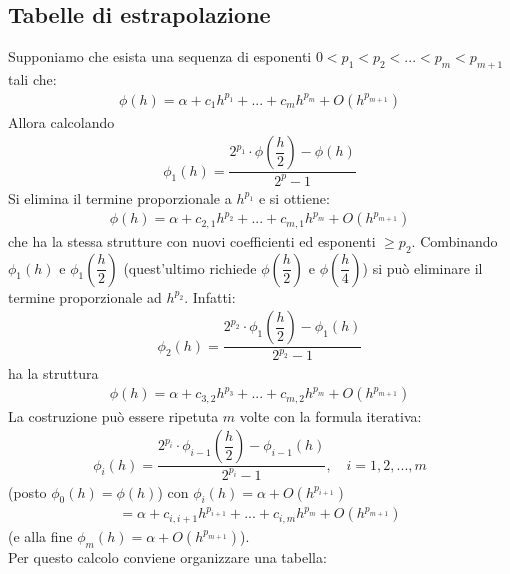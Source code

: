 \subsection{Tabelle di estrapolazione}
Supponiamo che esista una sequenza di esponenti $ 0<p_1<p_2<...<p_m<p_{m+1}$ tali che:
\[ \begin{split}
	\phi(h)=\alpha+c_1h^{p_1}+...+c_mh^{p_m}+O(h^{p_{m+1}})
\end{split} \]
Allora calcolando
\[ \begin{split}
	\phi_1(h)=\dfrac{2^{p_1}\cdot \phi\left( \dfrac{h}{2} \right)-\phi (h) }{2^p-1}
\end{split} \]
Si elimina il termine proporzionale a $h^{p_1}$ e si ottiene:
\[ \begin{split}
	\phi(h)=\alpha+c_{2,1}h^{p_2}+...+c_{m,1}h^{p_m}+O(h^{p_{m+1}})
\end{split} \]
che ha la stessa strutture con
nuovi coefficienti ed esponenti $\geq p_2$. Combinando $\phi_1(h)$ e $\phi_1 \left( \dfrac{h}{2} \right)$ (quest'ultimo richiede $\phi \left( \dfrac{h}{2} \right)$ e $\phi \left( \dfrac{h}{4} \right)$) si può eliminare il termine proporzionale ad $h^{p_2}$. Infatti:
\[ \begin{split}
	\phi_2(h)=\dfrac{2^{p_2}\cdot \phi_1\left( \dfrac{h}{2} \right) -\phi_1 (h)}{2^{p_2}-1}
\end{split} \]
ha la struttura
\[ \begin{split}
	\phi(h)=\alpha+c_{3,2}h^{p_3}+...+c_{m,2}h^{p_m}+O(h^{p_{m+1}})
\end{split} \]
La costruzione può essere ripetuta $m$ volte con la formula iterativa:
\[ \begin{split}
	\phi_i(h)=\dfrac{2^{p_i}\cdot \phi_{i-1} \left( \dfrac{h}{2} \right) -\phi_{i-1} (h)}{2^{p_i}-1}, \quad i=1,2,...,m
\end{split} \]
(posto $\phi_0(h)=\phi(h)$) con  $\phi_i(h)=\alpha + O(h^{p_{i+1}})$
\[ \begin{split}
	=\alpha+c_{i,i+1}h^{p_{i+1}}+...+c_{i,m}h^{p_m}+O(h^{p_{m+1}})
\end{split} \]
(e alla fine $\phi_m(h)=\alpha + O(h^{p_{m+1}})$).\\
Per questo calcolo conviene organizzare una tabella:

